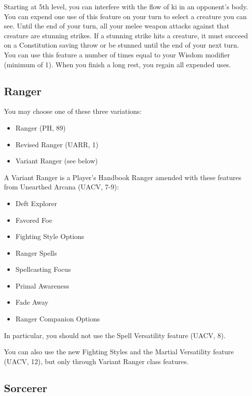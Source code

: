 \documentclass[letterpaper,twocolumn,openany,nodeprecatedcode]{dndbook}
\begin{document}
Starting at 5th level, you can interfere with the flow of ki in an opponent's body. You can expend one use of this feature on your turn to select a creature you can see. Until the end of your turn, all your melee weapon attacks against that creature are stunning strikes. If a stunning strike hits a creature, it must succeed on a Constitution saving throw or be stunned until the end of your next turn. You can use this feature a number of times equal to your Wisdom modifier (minimum of 1). When you finish a long rest, you regain all expended uses.

\subsection{Ranger}
\label{classRanger}

You may choose one of these three variations:

\begin{itemize}
    \item Ranger (PH, 89)
    \item Revised Ranger (UARR, 1)
    \item Variant Ranger (see below)
\end{itemize}

A Variant Ranger is a Player's Handbook Ranger amended with these features from Unearthed Arcana (UACV, 7-9):

\begin{itemize}
    \item Deft Explorer
    \item Favored Foe
    \item Fighting Style Options
    \item Ranger Spells
    \item Spellcasting Focus
    \item Primal Awareness
    \item Fade Away
    \item Ranger Companion Options
\end{itemize}

In particular, you should not use the Spell Versatility feature (UACV, 8).

You can also use the new Fighting Styles and the Martial Versatility feature (UACV, 12), but only through Variant Ranger class features.

\subsection{Sorcerer}
\end{document}
